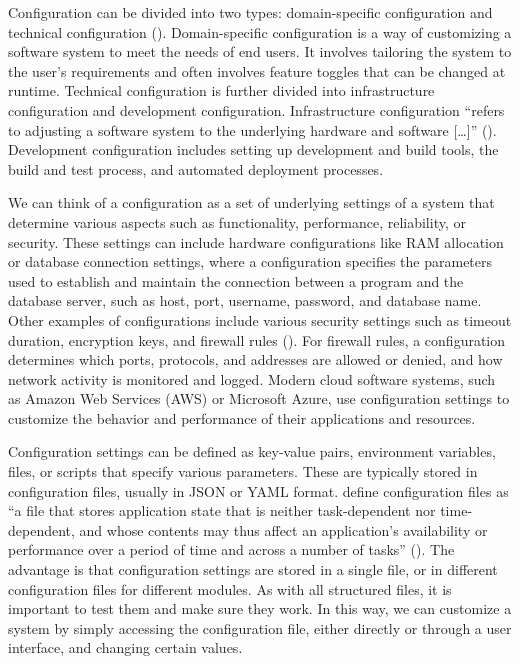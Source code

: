 \documentclass[english,bachelor]{swsLeipzig}
\begin{document}
Configuration can be divided into two types: 
domain-specific configuration and technical configuration (\citet{siegmund:2020}). Domain-specific configuration  is a way of customizing 
a software system to meet the needs of end users. It involves tailoring the system to the user's requirements and 
often involves feature toggles that can be changed at runtime. Technical configuration is further divided into 
infrastructure configuration and development configuration. Infrastructure configuration ``refers to adjusting a 
software system to the underlying hardware and software [\ldots]'' (\citet{siegmund:2020}). Development configuration includes setting up 
development and build tools, the build and test process, and automated deployment processes.

We can think of a configuration as a set of underlying settings of a system that determine various aspects such as 
functionality, performance, reliability, or security. These settings can include hardware configurations like RAM 
allocation or database connection settings, where a configuration specifies the parameters used to establish and 
maintain the connection between a program and the database server, such as host, port, username, password, and 
database name. Other examples of configurations include various security settings such as timeout duration, encryption 
keys, and firewall rules (\citet{atlassian:2023}). For firewall rules, a configuration determines which ports, protocols, and addresses 
are allowed or denied, and how network activity is monitored and logged. Modern cloud software systems, such as 
Amazon Web Services (AWS) or Microsoft Azure, use configuration settings to customize the behavior and performance 
of their applications and resources.

Configuration settings can be defined as key-value pairs, environment variables, files, or scripts that specify 
various parameters. These are typically stored in configuration files, usually in JSON or YAML format. \citet{huang:2017} define configuration files as ``a file that stores application state that is neither task-dependent nor 
time-dependent, and whose contents may thus affect an application's availability or performance over a period of 
time and across a number of tasks'' (\citet{huang:2017}). The advantage is that configuration settings are stored in a single file, 
or in different configuration files for different modules. As with all structured files, it is important to test 
them and make sure they work. In this way, we can customize a system by simply accessing the configuration file, 
either directly or through a user interface, and changing certain values.
\end{document}
